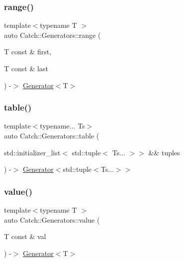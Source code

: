 \mbox{\label{namespace_catch_1_1_generators_acb1dc71e5494dbc60eb69a3136a5484c}} 
\subsubsection{\texorpdfstring{range()}{range()}}
{\footnotesize\ttfamily template$<$typename T $>$ \\
auto Catch\+::\+Generators\+::range (\begin{DoxyParamCaption}\item[{T const \&}]{first,  }\item[{T const \&}]{last }\end{DoxyParamCaption}) -\/$>$ \mbox{\hyperlink{class_catch_1_1_generators_1_1_generator}{Generator}}$<$T$>$ }

\mbox{\label{namespace_catch_1_1_generators_a82a6f998ff77cd9aae594ac6f8891bc1}} 
\subsubsection{\texorpdfstring{table()}{table()}}
{\footnotesize\ttfamily template$<$typename... Ts$>$ \\
auto Catch\+::\+Generators\+::table (\begin{DoxyParamCaption}\item[{std\+::initializer\+\_\+list$<$ std\+::tuple$<$ Ts... $>$$>$ \&\&}]{tuples }\end{DoxyParamCaption}) -\/$>$ \mbox{\hyperlink{class_catch_1_1_generators_1_1_generator}{Generator}}$<$std\+::tuple$<$Ts...$>$$>$ }

\mbox{\label{namespace_catch_1_1_generators_a13dbed5ff32f2363862c8ff26661e0ae}} 
\subsubsection{\texorpdfstring{value()}{value()}}
{\footnotesize\ttfamily template$<$typename T $>$ \\
auto Catch\+::\+Generators\+::value (\begin{DoxyParamCaption}\item[{T const \&}]{val }\end{DoxyParamCaption}) -\/$>$ \mbox{\hyperlink{class_catch_1_1_generators_1_1_generator}{Generator}}$<$T$>$ }

